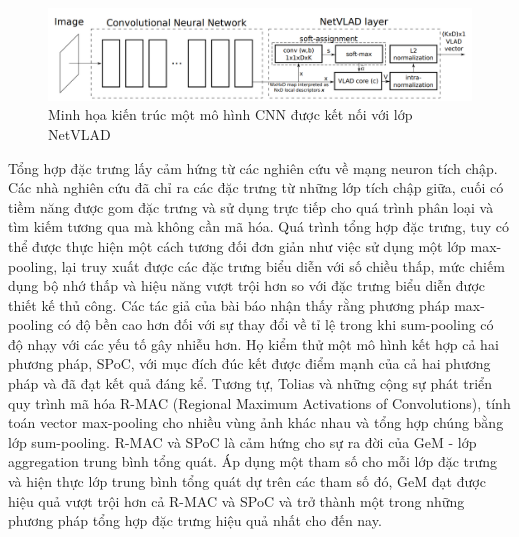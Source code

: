 \begin{figure}[h]
    \centering
    \includegraphics[width=\textwidth]{pics/Chapter2/netvladcnn.png}
    \caption{Minh họa kiến trúc một mô hình CNN được kết nối với lớp NetVLAD \cite{arandjelovic2016netvlad}}
\end{figure}

Tổng hợp đặc trưng lấy cảm hứng từ các nghiên cứu về mạng neuron tích chập. Các nhà nghiên cứu đã chỉ ra các đặc trưng từ những lớp tích chập giữa, cuối có tiềm năng được gom đặc trưng và sử dụng trực tiếp cho quá trình phân loại và tìm kiếm tương qua mà không cần mã hóa. Quá trình tổng hợp đặc trưng, tuy có thể được thực hiện một cách tương đối đơn giản như việc sử dụng một lớp max-pooling, lại truy xuất được các đặc trưng biểu diễn với số chiều thấp, mức chiếm dụng bộ nhớ thấp và hiệu năng vượt trội hơn so với đặc trưng biểu diễn được thiết kế thủ công. Các tác giả của bài báo \cite{mousavian2015deep} nhận thấy rằng phương pháp max-pooling có độ bền cao hơn đối với sự thay đổi về tỉ lệ trong khi sum-pooling có độ nhạy với các yếu tố gây nhiễu hơn. Họ kiểm thử một mô hình kết hợp cả hai phương pháp, SPoC, với mục đích đúc kết được điểm mạnh của cả hai phương pháp và đã đạt kết quả đáng kể. Tương tự, Tolias và những cộng sự \cite{tolias2015particular} phát triển quy trình mã hóa R-MAC (Regional Maximum Activations of Convolutions), tính toán vector max-pooling cho nhiều vùng ảnh khác nhau và tổng hợp chúng bằng lớp sum-pooling. R-MAC và SPoC là cảm hứng cho sự ra đời của GeM \cite{GeM} - lớp aggregation trung bình tổng quát. Áp dụng một tham số cho mỗi lớp đặc trưng và hiện thực lớp trung bình tổng quát dự trên các tham số đó, GeM đạt được hiệu quả vượt trội hơn cả R-MAC và SPoC và trở thành một trong những phương pháp tổng hợp đặc trưng hiệu quả nhất cho đến nay.